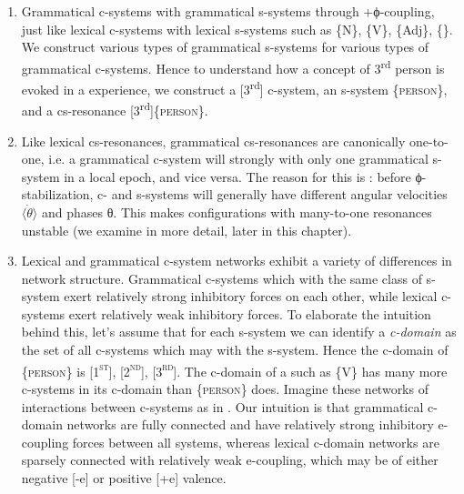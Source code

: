 \begin{enumerate}

\item Grammatical c-systems  with grammatical s-systems through +ϕ-coupling, just like lexical c-systems  with lexical s-systems such as \{N\}, \{V\}, \{Adj\}, \{\}. We construct various types of grammatical s-systems for various types of grammatical c-systems. Hence to understand how a concept of 3\textsuperscript{rd} person is evoked in a  experience, we construct a [3\textsuperscript{rd}] c-system, an s-system \{\textsc{person}\}, and a cs-resonance [3\textsuperscript{rd}]\{\textsc{person}\}. 

\item Like lexical cs-resonances, grammatical cs-resonances are canonically one-to-one, i.e. a grammatical c-system will strongly  with only one grammatical s-system in a local epoch, and vice versa. The reason for this is : before ϕ-stabilization, c- and s-systems will generally have different angular velocities $\langle\dot{\theta}\rangle$ and phases θ. This makes configurations with many-to-one resonances unstable (we examine  in more detail, later in this chapter).

\item Lexical and grammatical c-system networks exhibit a variety of differences in network structure. Grammatical c-systems which  with the same class of s-system exert relatively strong inhibitory forces on each other, while lexical c-systems exert relatively weak inhibitory forces. To elaborate the intuition behind this, let's assume that for each s-system we can identify a \textit{c-domain} as the set of all c-systems which may  with the s-system. Hence the c-domain of \{\textsc{person}\} is [1\textsc{\textsuperscript{st}}], [2\textsc{\textsuperscript{nd}}], [3\textsc{\textsuperscript{rd}}]. The c-domain of a  such as \{V\} has many more c-systems in its c-domain than \{\textsc{person}\} does. Imagine these networks of interactions between c-systems as in {}. Our intuition is that grammatical c-domain networks are fully connected and have relatively strong inhibitory e-coupling forces between all systems, whereas lexical c-domain networks are sparsely connected with relatively weak e-coupling, which may be of either negative [-e] or positive [+e] valence.


\end{enumerate}

